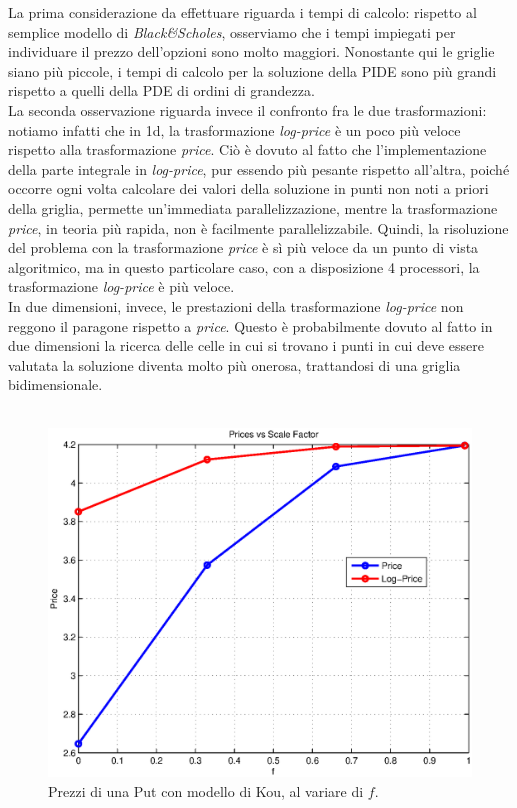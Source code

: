 \documentclass[a4paper,10pt]{report}
\theoremstyle{plain}
\theoremstyle{definition}
\theoremstyle{remark}
\begin{document}
La prima considerazione da effettuare riguarda i tempi di calcolo: rispetto al semplice modello di \emph{Black\&Scholes}, osserviamo che i tempi impiegati per individuare il prezzo dell'opzioni sono molto maggiori. Nonostante qui le griglie siano pi\`u piccole, i tempi di calcolo per la soluzione della PIDE sono pi\`u grandi rispetto a quelli della PDE di ordini di grandezza.\\La seconda osservazione riguarda invece il confronto fra le due trasformazioni: notiamo infatti che in 1d, la trasformazione \emph{log-price} \`e un poco pi\`u veloce rispetto alla trasformazione \emph{price}. Ci\`o \`e dovuto al fatto che l'implementazione della parte integrale in \emph{log-price}, pur essendo pi\`u pesante rispetto all'altra, poich\'e occorre ogni volta calcolare dei valori della soluzione in punti non noti a priori della griglia, permette un'immediata parallelizzazione, mentre la trasformazione \emph{price}, in teoria pi\`u rapida, non \`e facilmente parallelizzabile. Quindi, la risoluzione del problema con la trasformazione \emph{price} \`e s\`i pi\`u veloce da un punto di vista algoritmico, ma in questo particolare caso, con a disposizione 4 processori, la trasformazione \emph{log-price} \`e pi\`u veloce.\\In due dimensioni, invece, le prestazioni della trasformazione \emph{log-price} non reggono il paragone rispetto a \emph{price}. Questo è probabilmente dovuto al fatto in due dimensioni la ricerca delle celle in cui si trovano i punti in cui deve essere valutata la soluzione diventa molto più onerosa, trattandosi di una griglia bidimensionale.\\\\
\begin{figure}[htp!]
\begin{center}
\includegraphics[width=12cm]{img/test2-scalefactor.eps}
\caption{Prezzi di una Put con modello di Kou, al variare di $f$.}
\label{fig:test2-scalefactor}
\end{center}
\end{figure}
\end{document}
